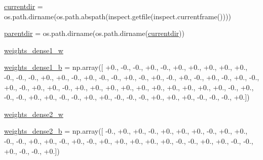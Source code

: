 \begin{DoxyCompactItemize}
\item 
\hyperlink{namespacepybullet-gym_1_1pybulletgym_1_1tests_1_1roboschool_1_1agents_1_1_inverted_pendulum_py_bullet_env__v0__2017may_afe05a25d80a7997a8105a0ea75ae62fa}{currentdir} = os.\+path.\+dirname(os.\+path.\+abspath(inspect.\+getfile(inspect.\+currentframe())))
\item 
\hyperlink{namespacepybullet-gym_1_1pybulletgym_1_1tests_1_1roboschool_1_1agents_1_1_inverted_pendulum_py_bullet_env__v0__2017may_ae0a0127f184562c37697d858b4f939e8}{parentdir} = os.\+path.\+dirname(os.\+path.\+dirname(\hyperlink{namespacepybullet-gym_1_1pybulletgym_1_1tests_1_1roboschool_1_1agents_1_1_inverted_pendulum_py_bullet_env__v0__2017may_afe05a25d80a7997a8105a0ea75ae62fa}{currentdir}))
\item 
\hyperlink{namespacepybullet-gym_1_1pybulletgym_1_1tests_1_1roboschool_1_1agents_1_1_inverted_pendulum_py_bullet_env__v0__2017may_afcb654695ef971ca8158e62d17907ccf}{weights\+\_\+dense1\+\_\+w}
\item 
\hyperlink{namespacepybullet-gym_1_1pybulletgym_1_1tests_1_1roboschool_1_1agents_1_1_inverted_pendulum_py_bullet_env__v0__2017may_affbfceaeabb4f73a860abd49529edc10}{weights\+\_\+dense1\+\_\+b} = np.\+array(\mbox{[} +0., -\/0., -\/0., +0., -\/0., +0., +0., +0., +0., +0., -\/0., -\/0., -\/0., +0., +0., -\/0., +0., -\/0., -\/0., +0., -\/0., +0., -\/0., +0., -\/0., +0., -\/0., +0., -\/0., +0., -\/0., +0., +0., -\/0., +0., +0., +0., +0., +0., +0., +0., +0., +0., +0., -\/0., +0., -\/0., -\/0., +0., +0., -\/0., -\/0., +0., +0., -\/0., -\/0., -\/0., +0., +0., +0., -\/0., -\/0., -\/0., +0.\mbox{]})
\item 
\hyperlink{namespacepybullet-gym_1_1pybulletgym_1_1tests_1_1roboschool_1_1agents_1_1_inverted_pendulum_py_bullet_env__v0__2017may_acdc0282ed73762b30c1670c5d9715eef}{weights\+\_\+dense2\+\_\+w}
\item 
\hyperlink{namespacepybullet-gym_1_1pybulletgym_1_1tests_1_1roboschool_1_1agents_1_1_inverted_pendulum_py_bullet_env__v0__2017may_ad51e99fdebf67f1a6e2f025289a0e324}{weights\+\_\+dense2\+\_\+b} = np.\+array(\mbox{[} -\/0., +0., +0., -\/0., +0., +0., +0., -\/0., +0., +0., -\/0., -\/0., +0., +0., -\/0., +0., -\/0., +0., +0., +0., +0., +0., -\/0., -\/0., +0., +0., -\/0., -\/0., +0., -\/0., -\/0., +0.\mbox{]})

\end{DoxyCompactItemize}
